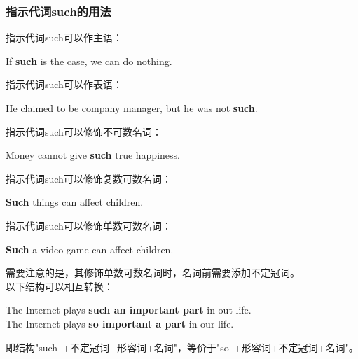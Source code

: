 \documentclass[UTF8]{ctexart}
\newcommand{\littf}[1]{{\hspace{3pt}\ttfamily #1}}
\begin{document}
\subsubsection{指示代词\littf{such}的用法}
    指示代词\littf{such}可以作主语：
    \begin{center}
        \large\ttfamily
        If \textbf{such} is the case, we can do nothing.\\[6mm]
    \end{center}
    指示代词\littf{such}可以作表语：
    \begin{center}
        \large\ttfamily
        He claimed to be company manager, but he was not \textbf{such}.\\[6mm]
    \end{center}
    指示代词\littf{such}可以修饰不可数名词：
    \begin{center}
        \large\ttfamily
        Money cannot give \textbf{such} true happiness.\\[6mm]
    \end{center}
    指示代词\littf{such}可以修饰复数可数名词：
    \begin{center}
        \large\ttfamily
        \textbf{Such} things can affect children.\\[6mm]
    \end{center}
    指示代词\littf{such}可以修饰单数可数名词：
    \begin{center}
        \large\ttfamily
        \textbf{Such} a video game can affect children.\\[6mm]
    \end{center}
    需要注意的是，其修饰单数可数名词时，名词前需要添加不定冠词。\\[8mm]
    以下结构可以相互转换：
    \begin{center}
        \large\ttfamily
        The Internet plays \textbf{such an important part} in out life.\\[3mm]
        The Internet plays \textbf{so important a part} in our life.\\[6mm]
    \end{center}
    即结构\littf{"such~+不定冠词+形容词+名词"}，等价于\littf{"so~+形容词+不定冠词+名词"}。

\newpage
\end{document}
